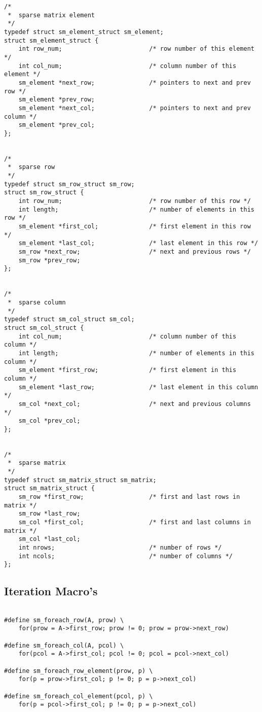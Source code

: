 \begin{verbatim}
/*
 *  sparse matrix element
 */
typedef struct sm_element_struct sm_element;
struct sm_element_struct {
    int row_num;                        /* row number of this element */
    int col_num;                        /* column number of this element */
    sm_element *next_row;               /* pointers to next and prev row */
    sm_element *prev_row;
    sm_element *next_col;               /* pointers to next and prev column */
    sm_element *prev_col;
};


/*
 *  sparse row
 */
typedef struct sm_row_struct sm_row;
struct sm_row_struct {
    int row_num;                        /* row number of this row */
    int length;                         /* number of elements in this row */
    sm_element *first_col;              /* first element in this row */
    sm_element *last_col;               /* last element in this row */
    sm_row *next_row;                   /* next and previous rows */
    sm_row *prev_row;
};


/*
 *  sparse column
 */
typedef struct sm_col_struct sm_col;
struct sm_col_struct {
    int col_num;                        /* column number of this column */
    int length;                         /* number of elements in this column */
    sm_element *first_row;              /* first element in this column */
    sm_element *last_row;               /* last element in this column */
    sm_col *next_col;                   /* next and previous columns */
    sm_col *prev_col;
};


/*
 *  sparse matrix
 */
typedef struct sm_matrix_struct sm_matrix;
struct sm_matrix_struct {
    sm_row *first_row;                  /* first and last rows in matrix */
    sm_row *last_row;
    sm_col *first_col;                  /* first and last columns in matrix */
    sm_col *last_col;
    int nrows;                          /* number of rows */
    int ncols;                          /* number of columns */
};
\end{verbatim}

\subsection{Iteration Macro's}
\begin{verbatim}

#define sm_foreach_row(A, prow) \
    for(prow = A->first_row; prow != 0; prow = prow->next_row)

#define sm_foreach_col(A, pcol) \
    for(pcol = A->first_col; pcol != 0; pcol = pcol->next_col)

#define sm_foreach_row_element(prow, p) \
    for(p = prow->first_col; p != 0; p = p->next_col)

#define sm_foreach_col_element(pcol, p) \
    for(p = pcol->first_col; p != 0; p = p->next_col)
\end{verbatim}

